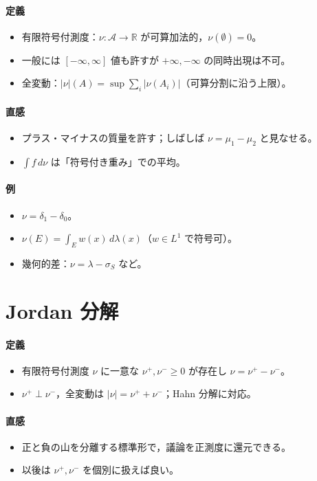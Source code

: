 \documentclass[dvipdfmx,autodetect-engine]{article}
\begin{document}
\paragraph{定義}
\begin{itemize}
  \item 有限符号付測度：\(\nu:\mathcal{A}\to\mathbb{R}\) が可算加法的，\(\nu(\emptyset)=0\)。
  \item 一般には \([-\infty,\infty]\) 値も許すが \(+\infty,-\infty\) の同時出現は不可。
  \item 全変動：\(|\nu|(A)=\sup\sum_i |\nu(A_i)|\)（可算分割に沿う上限）。
\end{itemize}
\paragraph{直感}
\begin{itemize}
  \item プラス・マイナスの質量を許す；しばしば \(\nu=\mu_1-\mu_2\) と見なせる。
  \item \(\int f\,d\nu\) は「符号付き重み」での平均。
\end{itemize}
\paragraph{例}
\begin{itemize}
  \item \(\nu=\delta_{1}-\delta_{0}\)。
  \item \(\nu(E)=\int_E w(x)\,d\lambda(x)\)（\(w\in L^1\) で符号可）。
  \item 幾何的差：\(\nu=\lambda-\sigma_S\) など。
\end{itemize}

\vspace{1em}

\section*{Jordan 分解}
\paragraph{定義}
\begin{itemize}
  \item 有限符号付測度 \(\nu\) に一意な \(\nu^+,\nu^-\ge0\) が存在し \(\nu=\nu^+-\nu^-\)。
  \item \(\nu^+\perp \nu^-\)，全変動は \(|\nu|=\nu^++\nu^-\)；Hahn 分解に対応。
\end{itemize}
\paragraph{直感}
\begin{itemize}
  \item 正と負の山を分離する標準形で，議論を正測度に還元できる。
  \item 以後は \(\nu^+,\nu^-\) を個別に扱えば良い。
\end{itemize}
\end{document}
